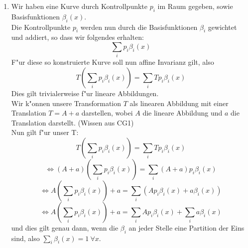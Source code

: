 \documentclass[a4paper,10pt]{scrartcl}
\begin{document}
\begin{enumerate}[1.]
\item
Wir haben eine Kurve durch Kontrollpunkte $p_i$ im Raum gegeben, sowie Basisfunktionen $\beta_i(x)$.\\
Die Kontrollpunkte $p_i$ werden nun durch die Basisfunktionen $\beta_i$ gewichtet und addiert, so dass wir folgendes erhalten:
$$\sum_i{p_i \beta_i(x)}$$
F"ur diese so konstruierte Kurve soll nun affine Invarianz gilt, also
$$T \left( \sum_i{p_i \beta_i(x)}\right) = \sum_i{T p_i \beta_i(x)}$$
Dies gilt trivialerweise f"ur lineare Abbildungen.\\
Wir k"onnen unsere Transformation $T$ als linearen Abbildung mit einer Translation $T = A + a$ darstellen, wobei $A$ die lineare Abbildung und $a$ die Translation darstellt. (Wissen aus CG1)\\
Nun gilt f"ur unser T:
$$T \left( \sum_i{p_i \beta_i(x)}\right) = \sum_i{T p_i \beta_i(x)}$$
$$\Leftrightarrow \left( A + a \right) \left( \sum_i{p_i \beta_i(x)}\right) = \sum_i{\left( A + a \right) p_i \beta_i(x)}$$
$$\Leftrightarrow A\left( \sum_i{p_i \beta_i(x)}\right) + a = \sum_i{\left( A p_i \beta_i(x) + a \beta_i(x) \right)} $$
$$\Leftrightarrow A\left( \sum_i{p_i \beta_i(x)}\right) + a = \sum_i{A p_i \beta_i(x)} + \sum_i{a \beta_i(x)}$$
und dies gilt genau dann, wenn die $\beta_i$ an jeder Stelle eine Partition der Eins sind, also $\sum_i{\beta_i(x)} = 1 ~ \forall x$.\\

\end{enumerate}
\end{document}
